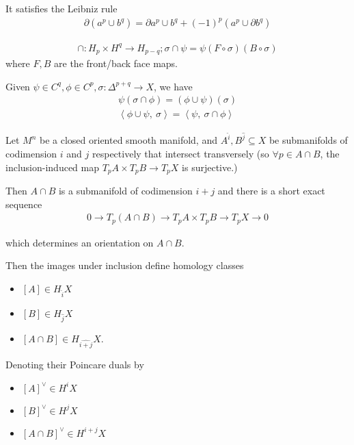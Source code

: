 It satisfies the Leibniz rule
\begin{align*}{\partial}(a^p \cup b^q) = {\partial}a^p \cup b^q + (-1)^p(a^p\cup {\partial}b^q)\end{align*}

\begin{align*}
\cap: H_p \times H^q \to H_{p-q}; \sigma \cap \psi = \psi(F\circ\sigma)(B\circ \sigma)
\end{align*}
where \(F,B\) are the front/back face maps.

Given \(\psi \in C^q, \phi \in C^p, \sigma: \Delta^{p+q} \to X\), we
have
\begin{align*}
\psi(\sigma \cap \phi) = (\phi \cup \psi)(\sigma)\\
{\left\langle {\phi\cup \psi},~{\sigma} \right\rangle} = {\left\langle {\psi},~{\sigma \cap \phi} \right\rangle}
\end{align*}

Let \(M^n\) be a closed oriented smooth manifold, and
\(A^{\widehat{i}}, B^{\widehat{j}} \subseteq X\) be submanifolds of
codimension \(i\) and \(j\) respectively that intersect transversely (so
\(\forall p\in A\cap B\), the inclusion-induced map
\(T_pA \times T_p B \to T_p X\) is surjective.)

Then \(A\cap B\) is a submanifold of codimension \(i+j\) and there is a
short exact sequence
\begin{align*}
0 \to T_p(A\cap B) \to T_p A \times T_p B \to T_p X \to 0
\end{align*}

which determines an orientation on \(A\cap B\).

Then the images under inclusion define homology classes

\begin{itemize}
\tightlist
\item
  \([A] \in H_{\widehat{i}}X\)
\item
  \([B] \in H_{\widehat{j}}X\)
\item
  \([A\cap B] \in H_{\widehat{i+j}}X\).
\end{itemize}

Denoting their Poincare duals by

\begin{itemize}
\tightlist
\item
  \([A]^\vee\in H^i X\)
\item
  \([B]^\vee\in H^j X\)
\item
  \([A\cap B]^\vee\in H^{i+j}X\)
\end{itemize}


